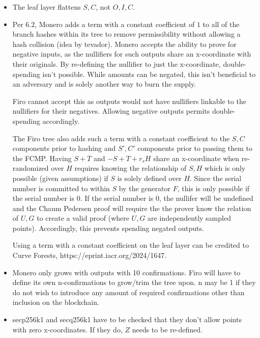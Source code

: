 \documentclass[]{article}
\begin{document}
\begin{itemize}
	\item The leaf layer flattens $S, C$, not $O, I, C$.

	\item Per 6.2, Monero adds a term with a constant coefficient of $1$ to all of the branch hashes within its tree to remove permissibility without allowing a hash collision (idea by tevador). Monero accepts the ability to prove for negative inputs, as the nullifiers for such outputs share an x-coordinate with their originals. By re-defining the nullifier to just the x-coordinate, double-spending isn't possible. While amounts can be negated, this isn't beneficial to an adversary and is solely another way to burn the supply.
	
	Firo cannot accept this as outputs would not have nullifiers linkable to the nullifiers for their negatives. Allowing negative outputs permits double-spending accordingly.

	The Firo tree also adds such a term with a constant coefficient to the $S, C$ components prior to hashing and $S', C'$ components prior to passing them to the FCMP. Having $S + T$ and $-S + T + r_s H$ share an x-coordinate when re-randomized over $H$ requires knowing the relationship of $S, H$ which is only possible (given assumptions) if $S$ is solely defined over $H$. Since the serial number is committed to within $S$ by the generator $F$, this is only possible if the serial number is $0$. If the serial number is $0$, the nullifer will be undefined and the Chaum Pedersen proof will require the the prover know the relation of $U, G$ to create a valid proof (where $U, G$ are independently sampled points). Accordingly, this prevents spending negated outputs.
	
	Using a term with a constant coefficient on the leaf layer can be credited to Curve Forests, https://eprint.iacr.org/2024/1647.

	\item Monero only grows with outputs with 10 confirmations. Firo will have to define its own n-confirmations to grow/trim the tree upon. n may be 1 if they do not wish to introduce any amount of required confirmations other than inclusion on the blockchain.
	
	\item secp256k1 and secq256k1 have to be checked that they don't allow points with zero x-coordinates. If they do, $Z$ needs to be re-defined.
\end{itemize}
\end{document}
